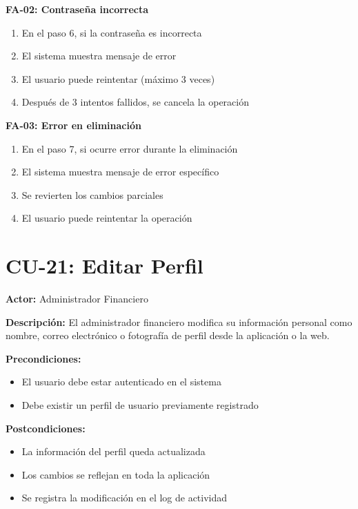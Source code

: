 \textbf{FA-02: Contraseña incorrecta}
\begin{enumerate}
    \item En el paso 6, si la contraseña es incorrecta
    \item El sistema muestra mensaje de error
    \item El usuario puede reintentar (máximo 3 veces)
    \item Después de 3 intentos fallidos, se cancela la operación
\end{enumerate}

\textbf{FA-03: Error en eliminación}
\begin{enumerate}
    \item En el paso 7, si ocurre error durante la eliminación
    \item El sistema muestra mensaje de error específico
    \item Se revierten los cambios parciales
    \item El usuario puede reintentar la operación
\end{enumerate}

\section{CU-21: Editar Perfil}

\noindent\textbf{Actor:} Administrador Financiero

\noindent\textbf{Descripción:} El administrador financiero modifica su información personal como nombre, correo electrónico o fotografía de perfil desde la aplicación o la web.

\noindent\textbf{Precondiciones:}
\begin{itemize}
    \item El usuario debe estar autenticado en el sistema
    \item Debe existir un perfil de usuario previamente registrado
\end{itemize}

\noindent\textbf{Postcondiciones:}
\begin{itemize}
    \item La información del perfil queda actualizada
    \item Los cambios se reflejan en toda la aplicación
    \item Se registra la modificación en el log de actividad
\end{itemize}

